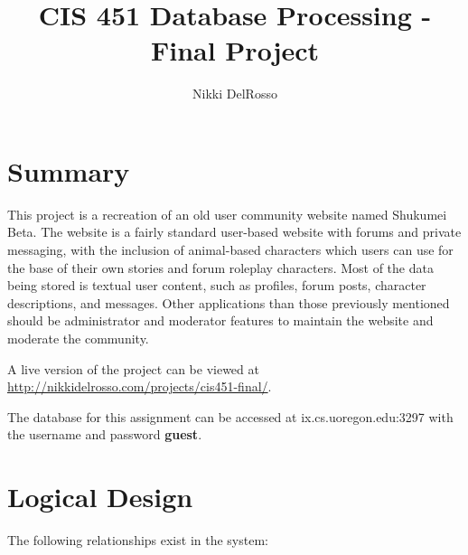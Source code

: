 \documentclass{book}
\begin{document}
\title{CIS 451 Database Processing - Final Project}
\author{Nikki DelRosso}
\maketitle
\thispagestyle{empty}
\let\cleardoublepage\clearpage

\tableofcontents
\newpage

\section{Summary}

This project is a recreation of an old user community website named Shukumei Beta.  The website is a fairly standard user-based website with forums and private messaging, with the inclusion of animal-based characters which users can use for the base of their own stories and forum roleplay characters.  Most of the data being stored is textual user content, such as profiles, forum posts, character descriptions, and messages.  Other applications than those previously mentioned should be administrator and moderator features to maintain the website and moderate the community.

A live version of the project can be viewed at \url{http://nikkidelrosso.com/projects/cis451-final/}.

The database for this assignment can be accessed at ix.cs.uoregon.edu:3297 with the username and password {\bf guest}.

\section{Logical Design}

The following relationships exist in the system:
\end{document}
